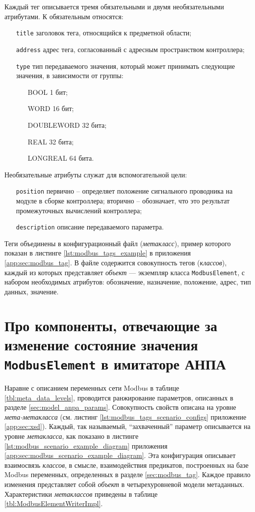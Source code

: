 Каждый тег описывается тремя обязательными и двумя необязательными атрибутами.
К обязательным относятся:
\begin{itemize}
    \item[\texttt{title}] заголовок тега, относящийся к предметной области;
    \item[\texttt{address}] адрес тега, согласованный с адресным пространством контроллера;
    \item[\texttt{type}] тип передаваемого значения, который может принимать следующие значения, в зависимости от группы:
    \begin{itemize}
        \item[BOOL] 1 бит;
        \item[WORD] 16 бит;
        \item[DOUBLEWORD] 32 бита;
        \item[REAL] 32 бита;
        \item[LONGREAL] 64 бита.
    \end{itemize}
\end{itemize}
Необязательные атрибуты служат для вспомогательной цели:
\begin{itemize}
    \item[\texttt{position}] первично -- определяет положение сигнального проводника на модуле в сборке контроллера;
    вторично -- обозначает, что это результат промежуточных вычислений контроллера;
    \item[\texttt{description}] описание передаваемого параметра.
\end{itemize}

Теги объединены в конфигурационный файл (\textit{метакласс}), пример которого показан 
в листинге \ref{lst:modbus_tags_example} в приложения \ref{app:sec:modbus_tag}.
В файле содержится совокупность тегов (\textit{классов}),
каждый из которых представляет \textit{объект} --- экземпляр класса \texttt{ModbusElement},
с набором необходимых атрибутов: обозначение, назначение, положение, адрес, тип данных, значение.


\section{Про компоненты, отвечающие за изменение состояние значения \texttt{ModbusElement} в имитаторе АНПА}\label{sec:writers_def}

Наравне с описанием переменных сети Modbus в таблице \ref{tbl:meta_data_levels},
проводится ранжирование параметров, описанных в разделе \ref{sec:model_anpa_params}.
Совокупность свойств описана на уровне \textit{мета-метакласса} (см. листинг \ref{lst:modbus_tags_scenario_configs} приложение \ref{app:sec:xsd}).
Каждый, так называемый, ``захваченный'' параметр описывается на уровне \textit{метакласса},
как показано в листинге \ref{lst:modbus_scenario_example_diagram} приложения \ref{app:sec:modbus_scenario_example_diagram}.
%
Эта конфигурация описывает взаимосвязь \textit{классов}, в смысле, взаимодействия предикатов, построенных на базе 
Modbus переменных, определенных в разделе \ref{sec:modbus_tag}.
Каждое правило изменения представляет собой \textit{объект} в четырехуровневой модели метаданных.
Характеристики \textit{метаклассов} приведены в таблице \ref{tbl:ModbusElementWriterImpl}.


